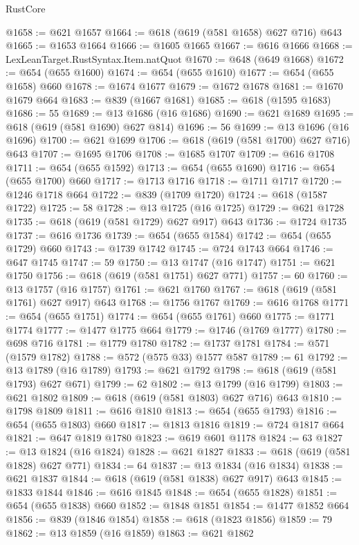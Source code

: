 \begin{lexlean}{RustCore}
\begin{coremodule}
@1658 := @621 @1657
@1664 := @618 (@619 (@581 @1658) @627 @716) @643
@1665 := @1653 @1664
@1666 := @1605 @1665
@1667 := @616 @1666
@1668 := LexLeanTarget.RustSyntax.Item.natQuot
@1670 := @648 (@649 @1668)
@1672 := @654 (@655 @1600)
@1674 := @654 (@655 @1610)
@1677 := @654 (@655 @1658) @660
@1678 := @1674 @1677
@1679 := @1672 @1678
@1681 := @1670 @1679 @664
@1683 := @839 (@1667 @1681)
@1685 := @618 (@1595 @1683)
@1686 := 55
@1689 := @13 @1686 (@16 @1686)
@1690 := @621 @1689
@1695 := @618 (@619 (@581 @1690) @627 @814)
@1696 := 56
@1699 := @13 @1696 (@16 @1696)
@1700 := @621 @1699
@1706 := @618 (@619 (@581 @1700) @627 @716) @643
@1707 := @1695 @1706
@1708 := @1685 @1707
@1709 := @616 @1708
@1711 := @654 (@655 @1592)
@1713 := @654 (@655 @1690)
@1716 := @654 (@655 @1700) @660
@1717 := @1713 @1716
@1718 := @1711 @1717
@1720 := @1246 @1718 @664
@1722 := @839 (@1709 @1720)
@1724 := @618 (@1587 @1722)
@1725 := 58
@1728 := @13 @1725 (@16 @1725)
@1729 := @621 @1728
@1735 := @618 (@619 (@581 @1729) @627 @917) @643
@1736 := @1724 @1735
@1737 := @616 @1736
@1739 := @654 (@655 @1584)
@1742 := @654 (@655 @1729) @660
@1743 := @1739 @1742
@1745 := @724 @1743 @664
@1746 := @647 @1745
@1747 := 59
@1750 := @13 @1747 (@16 @1747)
@1751 := @621 @1750
@1756 := @618 (@619 (@581 @1751) @627 @771)
@1757 := 60
@1760 := @13 @1757 (@16 @1757)
@1761 := @621 @1760
@1767 := @618 (@619 (@581 @1761) @627 @917) @643
@1768 := @1756 @1767
@1769 := @616 @1768
@1771 := @654 (@655 @1751)
@1774 := @654 (@655 @1761) @660
@1775 := @1771 @1774
@1777 := @1477 @1775 @664
@1779 := @1746 (@1769 @1777)
@1780 := @698 @716
@1781 := @1779 @1780
@1782 := @1737 @1781
@1784 := @571 (@1579 @1782)
@1788 := @572 (@575 @33) @1577 @587
@1789 := 61
@1792 := @13 @1789 (@16 @1789)
@1793 := @621 @1792
@1798 := @618 (@619 (@581 @1793) @627 @671)
@1799 := 62
@1802 := @13 @1799 (@16 @1799)
@1803 := @621 @1802
@1809 := @618 (@619 (@581 @1803) @627 @716) @643
@1810 := @1798 @1809
@1811 := @616 @1810
@1813 := @654 (@655 @1793)
@1816 := @654 (@655 @1803) @660
@1817 := @1813 @1816
@1819 := @724 @1817 @664
@1821 := @647 @1819 @1780
@1823 := @619 @601 @1178
@1824 := 63
@1827 := @13 @1824 (@16 @1824)
@1828 := @621 @1827
@1833 := @618 (@619 (@581 @1828) @627 @771)
@1834 := 64
@1837 := @13 @1834 (@16 @1834)
@1838 := @621 @1837
@1844 := @618 (@619 (@581 @1838) @627 @917) @643
@1845 := @1833 @1844
@1846 := @616 @1845
@1848 := @654 (@655 @1828)
@1851 := @654 (@655 @1838) @660
@1852 := @1848 @1851
@1854 := @1477 @1852 @664
@1856 := @839 (@1846 @1854)
@1858 := @618 (@1823 @1856)
@1859 := 79
@1862 := @13 @1859 (@16 @1859)
@1863 := @621 @1862

\end{coremodule}
\end{lexlean}
